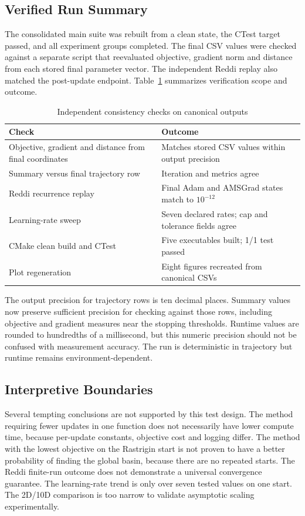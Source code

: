 ﻿\documentclass[conference]{IEEEtran}
\begin{document}
\subsection{Verified Run Summary}
The consolidated main suite was rebuilt from a clean state, the CTest target passed, and all experiment groups completed. The final CSV values were checked against a separate script that reevaluated objective, gradient norm and distance from each stored final parameter vector. The independent Reddi replay also matched the post-update endpoint. Table~\ref{tab:verification} summarizes verification scope and outcome.
\begin{table}[t]
\caption{Independent consistency checks on canonical outputs}
\label{tab:verification}
\centering
\small
\setlength{\tabcolsep}{3pt}
\renewcommand{\arraystretch}{1.15}
\begin{tabular}{>{\raggedright\arraybackslash}p{}@{\hspace{0.06\columnwidth}}>{\raggedright\arraybackslash}p{}}
\toprule
Check & Outcome\\
\midrule
Objective, gradient and distance from final coordinates & Matches stored CSV values within output precision\\
Summary versus final trajectory row & Iteration and metrics agree\\
Reddi recurrence replay & Final Adam and AMSGrad states match to $10^{-12}$\\
Learning-rate sweep & Seven declared rates; cap and tolerance fields agree\\
CMake clean build and CTest & Five executables built; 1/1 test passed\\
Plot regeneration & Eight figures recreated from canonical CSVs\\
\bottomrule
\end{tabular}
\end{table}

The output precision for trajectory rows is ten decimal places. Summary values now preserve sufficient precision for checking against those rows, including objective and gradient measures near the stopping thresholds. Runtime values are rounded to hundredths of a millisecond, but this numeric precision should not be confused with measurement accuracy. The run is deterministic in trajectory but runtime remains environment-dependent.
\subsection{Interpretive Boundaries}
Several tempting conclusions are not supported by this test design. The method requiring fewer updates in one function does not necessarily have lower compute time, because per-update constants, objective cost and logging differ. The method with the lowest objective on the Rastrigin start is not proven to have a better probability of finding the global basin, because there are no repeated starts. The Reddi finite-run outcome does not demonstrate a universal convergence guarantee. The learning-rate trend is only over seven tested values on one start. The 2D/10D comparison is too narrow to validate asymptotic scaling experimentally.
\end{document}
